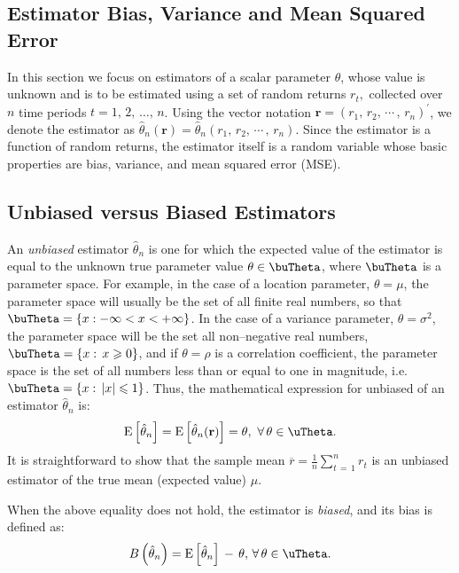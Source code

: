 \documentclass[graybox,envcountchap,sectrefs]{svmono}\usepackage[]{graphicx}\usepackage[]{xcolor}
\begin{document}
\begin{appendices}
\section{Estimator Bias, Variance and Mean Squared Error}

In this section we focus on estimators of a scalar parameter $\theta$,
whose value is unknown and is to be estimated using a set of random
returns $r_{t},$ collected over $n$ time periods $t=1,\,2,\,\ldots,\,n$.
Using the vector notation $\mathbf{r}=(r_{1},\,r_{2},\,\cdots\,,\,r_{n})^{\prime}$,
we denote the estimator as $\hat{\theta}_{n}(\mathbf{r})=\hat{\theta}_{n}(r_{1},\,r_{2},\,\cdots\,,\,r_{n})$.
Since the estimator is a function of random returns, the estimator
itself is a random variable whose basic properties are bias, variance,
and mean squared error (MSE).

\subsection{Unbiased versus Biased Estimators\label{subsec: estUnbiased}}

An \emph{unbiased }estimator $\hat{\theta}_{n}$ is one for which
the expected value of the estimator is equal to the unknown true parameter
value $\theta\in\buTheta$, where $\buTheta$ is a parameter space.
For example, in the case of a location parameter, $\theta=\mu$, the
parameter space will usually be the set of all finite real numbers,
so that $\buTheta=\left\{ x:-\infty<x<+\infty\right\} $. In the case
of a variance parameter, $\theta=\sigma^{2}$, the parameter space
will be the set all non--negative real numbers, $\buTheta=\left\{ x:\,x\geqslant0\right\} $,
and if $\theta=\rho$ is a correlation coefficient, the parameter
space is the set of all numbers less than or equal to one in magnitude,
i.e. $\buTheta=\left\{ x:\,|x|\leqslant1\right\} $. Thus, the mathematical
expression for unbiased of an estimator $\hat{\theta}_{n}$ is:
\begin{equation}
\mathrm{E}\left[\hat{\theta}_{n}\right]=\mathrm{E}\left[\hat{\theta}_{n}(\mathbf{r})\right]=\theta,\ \forall\,\theta\in\uTheta.\label{eq: unbiased estimator}
\end{equation}
It is straightforward to show that the sample mean $\overline{r}=\frac{1}{n}{\textstyle \sum_{t\,=\,1}^{n}r_{t}}$
is an unbiased estimator of the true mean (expected value) $\mu$.

When the above equality does not hold, the estimator is \emph{biased},
and its bias is defined as:
\begin{equation}
B\left(\hat{\theta}_{n}\right)=\mathrm{E}\left[\hat{\theta}_{n}\right]\,-\,\theta,\,\forall\,\theta\in\uTheta.\label{eq: biasDefinition}
\end{equation}


\end{appendices}
\end{document}
